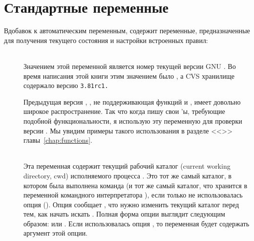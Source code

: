 \section{Стандартные переменные \GNUmake{}}
\label{sec:std_make_vars}

Вдобавок к автоматическим переменным, \GNUmake{} содержит переменные,
предназначенные для получения текущего состояния \GNUmake{} и
настройки встроенных правил:

\begin{description}
\item[] \hfill \\
Значением этой переменной является номер текущей версии GNU
\GNUmake{}.  Во время написания этой книги этим значением было
, а CVS хранилище содержало версию \texttt{3.81rc1.}

Предыдущая версия \GNUmake{}, , не поддерживающая
функций  и , имеет довольно широкое
распространение. Так что когда пишу свои \Makefile{}'ы, требующие
подобной функциональности, я использую эту переменную для проверки
версии \GNUmake{}. Мы увидим примеры такого использования в разделе
<<>> главы~\ref{chap:functions}.

\item[] \hfill \\
Эта переменная содержит текущий рабочий каталог (current working
directory, cwd) исполняемого процесса \GNUmake{}. Это тот же самый
каталог, в котором была выполнена команда \GNUmake{} (и тот же самый
каталог, что хранится в переменной командного интерпретатора
), если только не использовалась опция
 (). Опция
 сообщает \GNUmake{}, что нужно изменить
текущий каталог перед тем, как начать искать \Makefile{}. Полная форма
опции выглядит следующим образом:
 или
. Если использовалась опция
, то переменная  будет
содержать аргумент этой опции.


\end{description}
